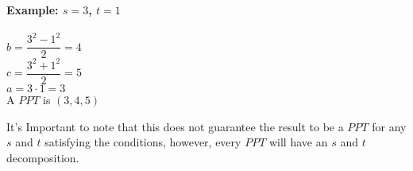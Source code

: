 \documentclass[../main.tex]{subfiles}
\begin{document}
\paragraph{Example: $s = 3$, $t = 1$}
\begin{center}
    $b=\dfrac{3^2-1^2}{2} = 4$ \\
    $c=\dfrac{3^2+1^2}{2} = 5$ \\
    $a=3 \cdot 1 = 3$ \\
    A $PPT$ is $(3, 4, 5)$
\end{center}
It's Important to note that this does not guarantee the result to be a $PPT$ for any $s$ and $t$ satisfying the conditions, however, every $PPT$ will have an $s$ and $t$ decomposition.
\end{document}
